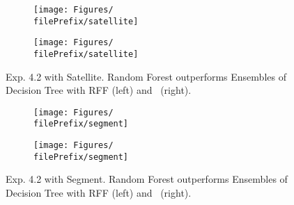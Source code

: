 \begin{figure}[H]
  \centering
  \renewcommand{\filePrefix}{\undPrefix/rff}
  \begin{subfigure}[t]{0.5\linewidth}
    \centering\captionsetup{width=.8\linewidth}\texttt{[image: Figures/\\filePrefix/satellite]}
    \label{fig:\undPrefix_satellite}
  \end{subfigure}%
  \renewcommand{\filePrefix}{\undPrefix/nys}%
  \begin{subfigure}[t]{0.5\linewidth}
    \centering\captionsetup{width=.8\linewidth}\texttt{[image: Figures/\\filePrefix/satellite]}
    \label{fig:\undPrefix_satellite}
  \end{subfigure}
  \caption*{Exp. 4.2 with Satellite. Random Forest outperforms Ensembles of Decision Tree with RFF (left) and \Nys\ (right).}
\end{figure}


\begin{figure}[H]
  \centering
  \renewcommand{\filePrefix}{\undPrefix/rff}
  \begin{subfigure}[t]{0.5\linewidth}
    \centering\captionsetup{width=.8\linewidth}\texttt{[image: Figures/\\filePrefix/segment]}
    \label{fig:\undPrefix_segment}
  \end{subfigure}%
  \renewcommand{\filePrefix}{\undPrefix/nys}%
  \begin{subfigure}[t]{0.5\linewidth}
    \centering\captionsetup{width=.8\linewidth}\texttt{[image: Figures/\\filePrefix/segment]}
    \label{fig:\undPrefix_segment}
  \end{subfigure}%
  \caption*{Exp. 4.2 with Segment. Random Forest outperforms Ensembles of Decision Tree with RFF (left) and \Nys\ (right).}
\end{figure}


